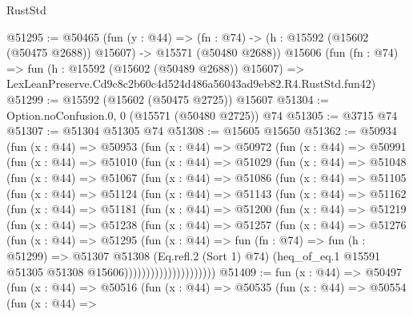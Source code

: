 \begin{lexlean}{RustStd}
\begin{coremodule}
@51295 := @50465
    (fun (y : @44) =>
    (fn : @74) -> (h : @15592 (@15602 (@50475 @2688)) @15607) -> @15571 (@50480 @2688))
    @15606
    (fun (fn : @74) =>
    fun (h : @15592 (@15602 (@50489 @2688)) @15607) =>
    LexLeanPreserve.Cd9c8c2b60c4d524d486a56043ad9eb82.R4.RustStd.fun42)
@51299 := @15592 (@15602 (@50475 @2725)) @15607
@51304 := Option.noConfusion.{0, 0} (@15571 (@50480 @2725)) @74
@51305 := @3715 @74
@51307 := @51304 @51305 @74
@51308 := @15605 @15650
@51362 := @50934
    (fun (x : @44) =>
    @50953
      (fun (x : @44) =>
      @50972
        (fun (x : @44) =>
        @50991
          (fun (x : @44) =>
          @51010
            (fun (x : @44) =>
            @51029
              (fun (x : @44) =>
              @51048
                (fun (x : @44) =>
                @51067
                  (fun (x : @44) =>
                  @51086
                    (fun (x : @44) =>
                    @51105
                      (fun (x : @44) =>
                      @51124
                        (fun (x : @44) =>
                        @51143
                          (fun (x : @44) =>
                          @51162
                            (fun (x : @44) =>
                            @51181
                              (fun (x : @44) =>
                              @51200
                                (fun (x : @44) =>
                                @51219
                                  (fun (x : @44) =>
                                  @51238
                                    (fun (x : @44) =>
                                    @51257
                                      (fun (x : @44) =>
                                      @51276
                                        (fun (x : @44) =>
                                        @51295
                                          (fun (x : @44) =>
                                          fun (fn : @74) =>
                                          fun (h : @51299) =>
                                          @51307
                                            @51308
                                            (Eq.refl.{2} (Sort 1) @74)
                                            (heq_of_eq.{1}
                                              @15591
                                              @51305
                                              @51308
                                              @15606)))))))))))))))))))))
@51409 := fun (x : @44) =>
  @50497
    (fun (x : @44) =>
    @50516
      (fun (x : @44) =>
      @50535
        (fun (x : @44) =>
        @50554
          (fun (x : @44) =>

\end{coremodule}
\end{lexlean}
